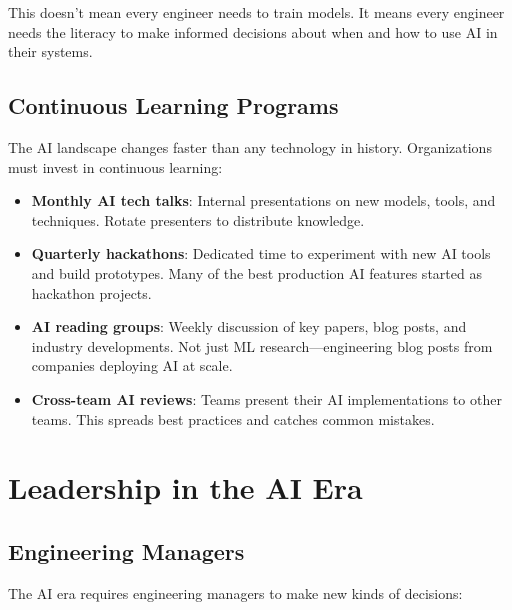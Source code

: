 This doesn't mean every engineer needs to train models. It means every engineer needs the literacy to make informed decisions about when and how to use AI in their systems.

\subsection{Continuous Learning Programs}

The AI landscape changes faster than any technology in history. Organizations must invest in continuous learning:

\begin{itemize}[leftmargin=*]
    \item \textbf{Monthly AI tech talks}: Internal presentations on new models, tools, and techniques. Rotate presenters to distribute knowledge.
    \item \textbf{Quarterly hackathons}: Dedicated time to experiment with new AI tools and build prototypes. Many of the best production AI features started as hackathon projects.
    \item \textbf{AI reading groups}: Weekly discussion of key papers, blog posts, and industry developments. Not just ML research---engineering blog posts from companies deploying AI at scale.
    \item \textbf{Cross-team AI reviews}: Teams present their AI implementations to other teams. This spreads best practices and catches common mistakes.
\end{itemize}


\section{Leadership in the AI Era}

\subsection{Engineering Managers}

The AI era requires engineering managers to make new kinds of decisions:


